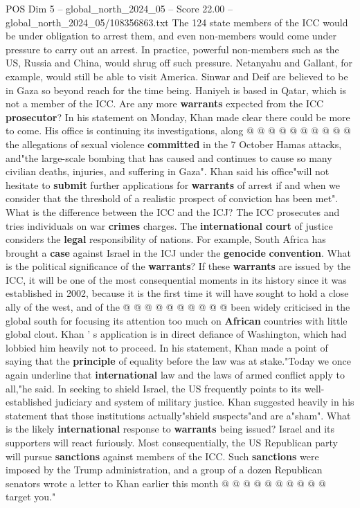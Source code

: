 \begin{textsample}{POS Dim 5 – global\_north\_2024\_05 – Score 22.00 – global\_north\_2024\_05/108356863.txt}
The 124 state members of the ICC would be under obligation to arrest them, and even non-members would come under pressure to carry out an arrest.
In practice, powerful non-members such as the US, Russia and China, would shrug off such pressure.
Netanyahu and Gallant, for example, would still be able to visit America.
Sinwar and Deif are believed to be in Gaza so beyond reach for the time being.
Haniyeh is based in Qatar, which is not a member of the ICC.
Are any more \textbf{warrants} expected from the ICC \textbf{prosecutor}?
In his statement on Monday, Khan made clear there could be more to come.
His office is continuing its investigations, along @ @ @ @ @ @ @ @ @ @ the allegations of sexual violence \textbf{committed} in the 7 October Hamas attacks, and"the large-scale bombing that has caused and continues to cause so many civilian deaths, injuries, and suffering in Gaza".
Khan said his office"will not hesitate to \textbf{submit} further applications for \textbf{warrants} of arrest if and when we consider that the threshold of a realistic prospect of conviction has been met".
What is the difference between the ICC and the ICJ?
The ICC prosecutes and tries individuals on war \textbf{crimes} charges.
The \textbf{international} \textbf{court} of justice considers the \textbf{legal} responsibility of nations.
For example, South Africa has brought a \textbf{case} against Israel in the ICJ under the \textbf{genocide} \textbf{convention}.
What is the political significance of the \textbf{warrants}?
If these \textbf{warrants} are issued by the ICC, it will be one of the most consequential moments in its history since it was established in 2002, because it is the first time it will have sought to hold a close ally of the west, and of the @ @ @ @ @ @ @ @ @ @ been widely criticised in the global south for focusing its attention too much on \textbf{African} countries with little global clout.
Khan ' s application is in direct defiance of Washington, which had lobbied him heavily not to proceed.
In his statement, Khan made a point of saying that the \textbf{principle} of equality before the law was at stake."Today we once again underline that \textbf{international} law and the laws of armed conflict apply to all,"he said.
In seeking to shield Israel, the US frequently points to its well-established judiciary and system of military justice.
Khan suggested heavily in his statement that those institutions actually"shield suspects"and are a"sham".
What is the likely \textbf{international} response to \textbf{warrants} being issued?
Israel and its supporters will react furiously.
Most consequentially, the US Republican party will pursue \textbf{sanctions} against members of the ICC.
Such \textbf{sanctions} were imposed by the Trump administration, and a group of a dozen Republican senators wrote a letter to Khan earlier this month @ @ @ @ @ @ @ @ @ @ target you."

\end{textsample}
